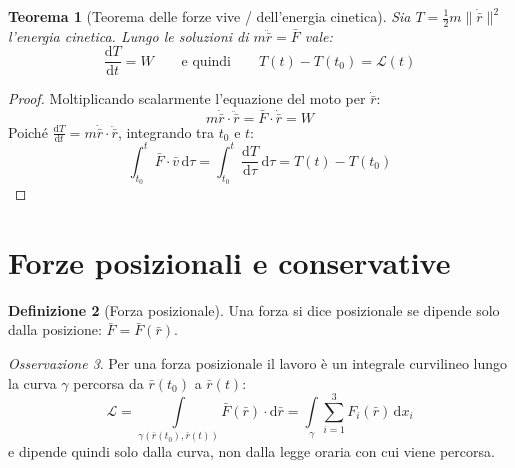 \documentclass[11pt, a4paper, openright]{book}
\theoremstyle{plain}
\newtheorem{teorema}{Teorema}[section]
\theoremstyle{definition}
\newtheorem{definizione}[teorema]{Definizione}
\theoremstyle{remark}
\newtheorem{osservazione}[teorema]{Osservazione}
\begin{document}
\begin{teorema}[Teorema delle forze vive / dell'energia cinetica]
    Sia $T = \frac{1}{2} m \|\dot{\bar{r}}\|^2$ l'energia cinetica. Lungo le soluzioni di $m\ddot{\bar{r}} = \bar{F}$ vale:
    \begin{equation}
        \frac{\mathrm{d}T}{\mathrm{d}t} = W \qquad \text{e quindi} \qquad T(t) - T(t_0) = \mathcal{L}(t)
    \end{equation}
\end{teorema}
\begin{proof}
    Moltiplicando scalarmente l'equazione del moto per $\dot{\bar{r}}$:
    \begin{equation}
        m\dot{\bar{r}} \cdot \ddot{\bar{r}} = \bar{F} \cdot \dot{\bar{r}} = W
    \end{equation}
    Poiché $\frac{\mathrm{d}T}{\mathrm{d}t} = m\dot{\bar{r}} \cdot \ddot{\bar{r}}$, integrando tra $t_0$ e $t$:
    \begin{equation}
        \int_{t_0}^{t} \bar{F} \cdot \bar{v}\, \mathrm{d}\tau = \int_{t_0}^{t} \frac{\mathrm{d}T}{\mathrm{d}\tau}\, \mathrm{d}\tau = T(t) - T(t_0)
    \end{equation}
\end{proof}

\section{Forze posizionali e conservative}

\begin{definizione}[Forza posizionale]
    Una forza si dice posizionale se dipende solo dalla posizione: $\bar{F} = \bar{F}(\bar{r})$.
\end{definizione}

\begin{osservazione}
    Per una forza posizionale il lavoro è un integrale curvilineo lungo la curva $\gamma$ percorsa da $\bar{r}(t_0)$ a $\bar{r}(t)$:
    \begin{equation}
        \mathcal{L} = \int\limits_{\gamma(\bar{r}(t_0), \bar{r}(t))} \bar{F}(\bar{r}) \cdot \mathrm{d}\bar{r} = \int\limits_{\gamma} \sum_{i = 1}^{3} F_i(\bar{r})\, \mathrm{d}x_i
    \end{equation}
    e dipende quindi solo dalla curva, non dalla legge oraria con cui viene percorsa.
\end{osservazione}
\end{document}
